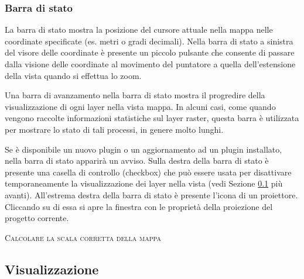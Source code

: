 \subsubsection{Barra di stato}\label{label_statusbar}

La barra di stato mostra la posizione del cursore attuale nella mappa nelle
coordinate specificate (es. metri o gradi decimali).
Nella barra di stato a sinistra del visore delle coordinate è presente un
piccolo pulsante che consente di passare dalla visione delle coordinate al
movimento del puntatore a
quella dell'estensione della vista quando si effettua lo zoom.

Una barra di avanzamento nella barra di stato mostra il progredire della
visualizzazione di ogni layer nella vista mappa. In alcuni casi, come quando
vengono raccolte informazioni statistiche sul layer raster, questa barra è
utilizzata per mostrare lo stato di tali processi, in genere molto lunghi. 

Se è disponibile un nuovo plugin o un aggiornamento ad un plugin installato,
nella barra di stato apparirà un avviso. Sulla destra della barra di stato è
presente una casella di controllo (checkbox) che può essere usata per
disattivare temporaneamente la visualizzazione dei layer nella vista (vedi
Sezione \ref{subsec:redraw_events} più avanti). All'estrema destra della barra
di stato è presente l'icona di un proiettore. Cliccando su di essa si apre la
finestra con le proprietà della proiezione del progetto corrente.

\begin{Tip}\caption{\textsc{Calcolare la scala corretta della mappa}}
\end{Tip}

\subsection{Visualizzazione}\label{subsec:redraw_events}

